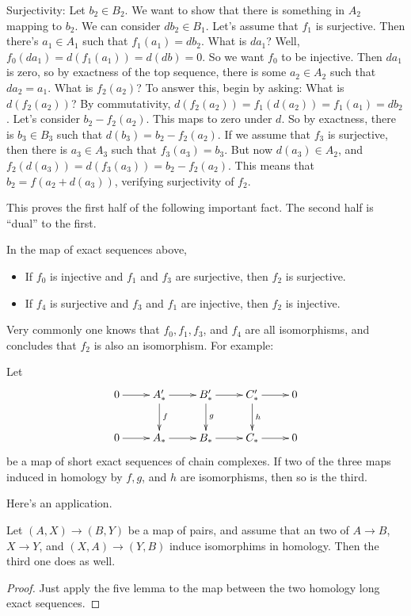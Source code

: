 Surjectivity:
Let $b_2\in B_2$. We want to show that there is something in $A_2$ mapping to $b_2$. We can consider $db_2\in B_1$. Let's assume that $f_1$ is surjective. Then there's $a_1\in A_1$ such that $f_1(a_1)=db_2$. What is $da_1$? Well, $f_0(da_1)=d(f_1(a_1))=d(db)=0$. So we want $f_0$ to be injective. Then $da_1$ is zero, so by exactness of the top sequence, there is some $a_2\in A_2$ such that $da_2=a_1$. What is $f_2(a_2)$? To answer this, begin by asking: What is $d(f_2(a_2))$? By commutativity, $d(f_2(a_2))=f_1(d(a_2))=f_1(a_1)=db_2$. Let's consider $b_2-f_2(a_2)$. This maps to zero under $d$. So by exactness, there is $b_3\in B_3$ such that $d(b_3)=b_2-f_2(a_2)$. If we assume that $f_3$ is surjective, then there is $a_3\in A_3$ such that $f_3(a_3)=b_3$. But now $d(a_3)\in A_2$, and $f_2(d(a_3))=d(f_3(a_3))=b_2-f_2(a_2)$. This means that $b_2=f(a_2+d(a_3))$, verifying surjectivity of $f_2$. 

This proves the first half of the following important fact. The second half 
is ``dual'' to the first. 
\begin{prop}
In the map of exact sequences above, 
\begin{itemize}
\item If $f_0$ is injective and $f_1$ and $f_3$ are surjective, then $f_2$ is surjective.
\item If $f_4$ is surjective and $f_3$ and $f_1$ are injective, then $f_2$ is injective.
\end{itemize}
\end{prop}

Very commonly one knows that $f_0,f_1,f_3$, and $f_4$ are all isomorphisms, 
and concludes that $f_2$ is also an isomorphism. For example:
\begin{corollary}
Let 
\[
\xymatrix{
0 \ar[r] & A'_* \ar[r] \ar[d]^f & B'_* \ar[r] \ar[d]^g & C'_* \ar[r] \ar[d]^h 
& 0 \\
0 \ar[r] & A_* \ar[r] & B_* \ar[r] & C_* \ar[r]  & 0 
}\]
be a map of short exact sequences of chain complexes. If two of the three maps induced in homology by $f,g$, and $h$ are isomorphisms, then so is the third. 
\end{corollary}

Here's an application.
\begin{prop}
Let $(A,X)\to(B,Y)$ be a map of pairs, and assume that an two of 
$A\to B$, $X\to Y$, and $(X,A)\to(Y,B)$ induce isomorphims in homology. 
Then the third one does as well.
\end{prop}
\begin{proof}
Just apply the five lemma to the map between the two homology long exact 
sequences.
\end{proof}

